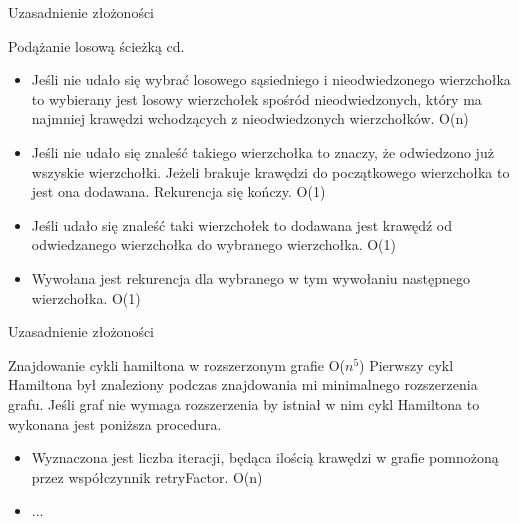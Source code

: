 \documentclass{beamer}
\begin{document}
\begin{frame}{Uzasadnienie złożoności}
\begin{block}{Podążanie losową ścieżką cd.}
\justifying
    \begin{itemize}
        \item Jeśli nie udało się wybrać losowego sąsiedniego i nieodwiedzonego wierzchołka to wybierany jest losowy wierzchołek spośród  nieodwiedzonych, który ma najmniej krawędzi wchodzących z nieodwiedzonych wierzchołków. O(n) \\
        \item Jeśli nie udało się znaleść takiego wierzchołka to znaczy, że odwiedzono już wszyskie wierzchołki. Jeżeli brakuje krawędzi do początkowego wierzchołka to jest ona dodawana. Rekurencja się kończy. O(1)
        \item Jeśli udało się znaleść taki wierzchołek to dodawana jest krawędź od odwiedzanego wierzchołka do wybranego wierzchołka. O(1) \\
        \item Wywołana jest rekurencja dla wybranego w tym wywołaniu następnego wierzchołka. O(1)
    \end{itemize}
\end{block}
\end{frame}

\begin{frame}{Uzasadnienie złożoności}
\begin{block}{Znajdowanie cykli hamiltona w rozszerzonym grafie O($n^5$)}
\justifying
Pierwszy cykl Hamiltona był znaleziony podczas znajdowania mi minimalnego rozszerzenia grafu.
Jeśli graf nie wymaga rozszerzenia by istniał w nim cykl Hamiltona to wykonana jest poniższa procedura. 
\begin{itemize}
    \item Wyznaczona jest liczba iteracji, będąca ilością krawędzi w grafie pomnożoną przez współczynnik retryFactor. O(n)
    \item ...
\end{itemize}
\end{block}
\end{frame}
\end{document}
